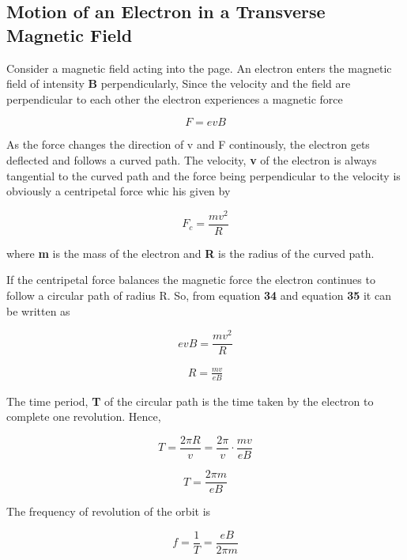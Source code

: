 \documentclass[a4paper,20pt,twoside]{report}
\begin{document}
	\vspace{10mm}
	\subsection{Motion of an Electron in a Transverse Magnetic Field}
	
	Consider a magnetic field acting into the page. An electron enters the magnetic field of intensity \textbf{B} perpendicularly, Since the velocity and the field are perpendicular to each other the electron experiences a magnetic force 
	
	\begin{equation}
	F = evB
	\end{equation}
	
	\vspace{4mm}
	As the force changes the direction of v and F continously, the electron gets deflected and follows a curved path. The velocity, \textbf{v} of the electron is always tangential to the curved path and the force being perpendicular to the velocity is obviously a centripetal force whic his given by 
	
	\begin{equation}
	F_c = \frac{mv^2}{R}
	\end{equation}
	\vspace{4mm}
	
	where \textbf{m} is the mass of the electron and \textbf{R} is the radius of the curved path.
	
	If the centripetal force balances the magnetic force the electron continues to follow a circular path of radius R. So, from equation \textbf{34} and equation \textbf{35} it can be written as 
	
	\begin{equation}
	evB = \frac{mv^2}{R}
	\end{equation}
	
	\begin{eqnarray}
	R = \frac{mv}{eB}
	\end{eqnarray}
	
	\vspace{4mm}
	
	The time period, \textbf{T} of the circular path is the time taken by the electron to complete one revolution. Hence, 
	
	\begin{equation}
	T = \frac{2 \pi R}{v} = \frac{2\pi}{v} \cdot \frac{mv}{eB}
	\end{equation}
	

	\begin{equation}
	T = \frac{2\pi m}{eB}
	\end{equation}

	\vspace{4mm}
	
	The frequency of revolution of the orbit is 
	
	\begin{equation}
	f = \frac{1}{T} =\frac{eB}{2 \pi m}
	\end{equation}
	
  	
\end{document}
